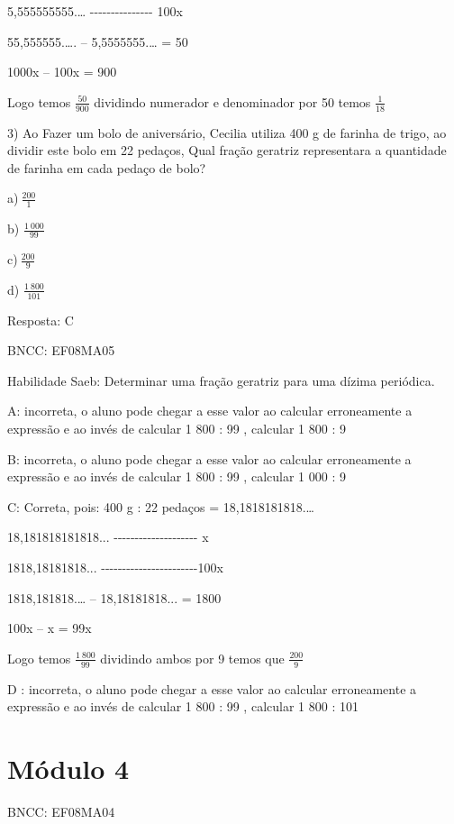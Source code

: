 5,555555555.\ldots{} -\/-\/-\/-\/-\/-\/-\/-\/-\/-\/-\/-\/-\/-\/- 100x

55,555555.\ldots. -- 5,5555555.\ldots{} = 50

1000x -- 100x = 900

Logo temos \(\frac{50}{900}\) dividindo numerador e denominador por 50
temos \(\frac{1}{18}\)

3) Ao Fazer um bolo de aniversário, Cecilia utiliza 400 g de farinha de
trigo, ao dividir este bolo em 22 pedaços, Qual fração geratriz
representara a quantidade de farinha em cada pedaço de bolo?

a)\(\ \frac{200}{1}\)

b) \(\frac{1\ 000}{99}\)

c)\(\ \frac{200}{9}\)

d) \(\frac{1\ 800}{101}\)

Resposta: C

BNCC: EF08MA05

Habilidade Saeb: Determinar uma fração geratriz para uma dízima
periódica.

A: incorreta, o aluno pode chegar a esse valor ao calcular erroneamente
a expressão e ao invés de calcular 1 800 : 99 , calcular 1 800 : 9

B: incorreta, o aluno pode chegar a esse valor ao calcular erroneamente
a expressão e ao invés de calcular 1 800 : 99 , calcular 1 000 : 9

C: Correta, pois: 400 g : 22 pedaços = 18,1818181818.\ldots{}

18,181818181818...
-\/-\/-\/-\/-\/-\/-\/-\/-\/-\/-\/-\/-\/-\/-\/-\/-\/-\/-\/- x

1818,18181818...
-\/-\/-\/-\/-\/-\/-\/-\/-\/-\/-\/-\/-\/-\/-\/-\/-\/-\/-\/-\/-\/-\/-100x

1818,181818.\ldots{} -- 18,18181818... = 1800

100x -- x = 99x

Logo temos \(\frac{1\ 800}{99}\) dividindo ambos por 9 temos que
\(\frac{200}{9}\)

D : incorreta, o aluno pode chegar a esse valor ao calcular erroneamente
a expressão e ao invés de calcular 1 800 : 99 , calcular 1 800 : 101

\hypertarget{muxf3dulo-4}{%
\section{Módulo 4}\label{muxf3dulo-4}}

BNCC: EF08MA04


